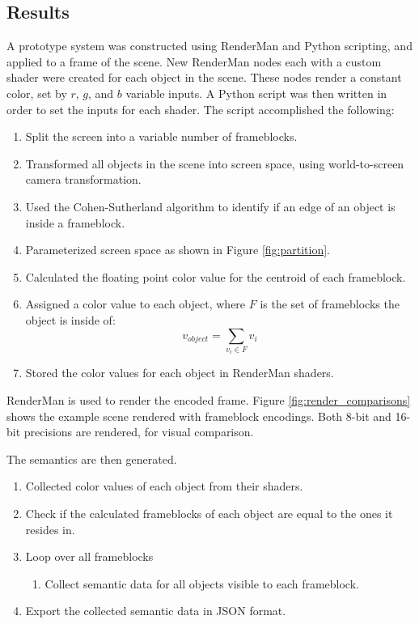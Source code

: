 \documentclass[conference]{IEEEtran}
\begin{document}
\subsection{Results}
A prototype system was constructed using RenderMan
and Python scripting, and applied to a frame of the scene.
New RenderMan nodes each with a custom shader were created for each object in the scene.
These nodes render a constant color, set by $r$, $g$, and $b$ variable inputs.
A Python script was then written in order to set the inputs for each shader.
The script accomplished the following:
\bigskip
\begin{enumerate}
\item Split the screen into a variable number of frameblocks.
\item Transformed all objects in the scene into screen space, using world-to-screen camera transformation.
\item Used the Cohen-Sutherland algorithm to identify if an edge of an object is inside a frameblock.
\item Parameterized screen space as shown in Figure \ref{fig:partition}.
\item Calculated the floating point color value for the centroid of each frameblock.
\item Assigned a color value to each object, where
$F$ is the set of frameblocks the object is inside of:
$$v_{object} = \sum_{v_i\in F}v_i$$
\item Stored the color values for each object in RenderMan shaders.
\end{enumerate}
\bigskip
RenderMan is used to render the encoded frame.
Figure \ref{fig:render_comparisons}
shows the example scene rendered with frameblock encodings.
Both 8-bit and 16-bit precisions are rendered, for visual comparison.

The semantics are then generated.
\bigskip
\begin{enumerate}
\item Collected color values of each object from their shaders.
\item Check if the calculated frameblocks of each object are equal to the ones it
resides in.
\item Loop over all frameblocks
\begin{enumerate}
\item Collect semantic data for all objects visible to each frameblock.
\end{enumerate}
\item Export the collected semantic data in JSON format.
\end{enumerate}
\end{document}
